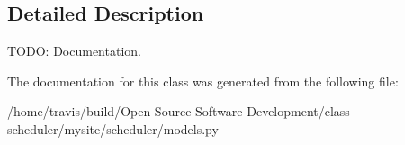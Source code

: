 \subsection{Detailed Description}
T\-O\-D\-O\-: Documentation. 

The documentation for this class was generated from the following file\-:\begin{DoxyCompactItemize}
\item 
/home/travis/build/\-Open-\/\-Source-\/\-Software-\/\-Development/class-\/scheduler/mysite/scheduler/models.\-py\end{DoxyCompactItemize}
